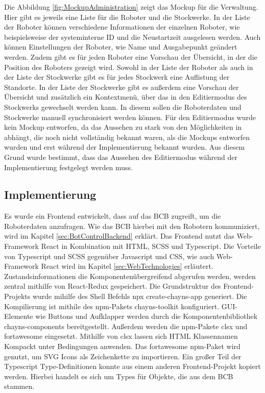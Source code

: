 Die Abbildung \ref{fig:MockupAdministration} zeigt das Mockup für die Verwaltung. Hier gibt es jeweils eine Liste für die Roboter und die Stockwerke. In der Liste der Roboter können verschiedene Informationen der einzelnen Roboter, wie beispielsweise der systeminterne \ac{ID} und die Neustartzeit ausgelesen werden. Auch können Einstellungen der Roboter, wie Name und Ausgabepunkt geändert werden. Zudem gibt es für jeden Roboter eine Vorschau der Übersicht, in der die Position des Roboters gezeigt wird. Sowohl in der Liste der Roboter als auch in der Liste der Stockwerke gibt es für jedes Stockwerk eine Auflistung der Standorte. In der Liste der Stockwerke gibt es außerdem eine Vorschau der Übersicht und zusätzlich ein Kontextmenü, über das in den Editiermodus des Stockwerks gewechselt werden kann. In diesem sollen die Roboterdaten und Stockwerke manuell synchronisiert werden können. Für den Editiermodus wurde kein Mockup entworfen, da das Aussehen zu stark von den Möglichkeiten in \deckgl{} abhängt, die noch nicht vollständig bekannt waren, als die Mockups entworfen wurden und erst während der Implementierung bekannt wurden. Aus diesem Grund wurde bestimmt, dass das Aussehen des Editiermodus während der Implementierung festgelegt werden muss.

\subsection{Implementierung}
Es wurde ein Frontend entwickelt, dass auf das \ac{BCB} zugreift, um die Roboterdaten anzufragen. Wie das \ac{BCB} hierbei mit den Robotern kommuniziert, wird im Kapitel \ref{sec:BotControlBackend} erklärt. Das Frontend nutzt das Web-Framework React in Kombination mit \ac{HTML}, \ac{SCSS} und Typescript. Die Vorteile von Typescript und \ac{SCSS} gegenüber Javascript und \ac{CSS}, wie auch Web-Framework React wird im Kapitel \ref{sec:WebTechnologies} erläutert.
Zustandsinformationen die Komponentenübergreifend abgerufen werden, werden zentral mithilfe von React-Redux gespeichert. Die Grundstruktur des Frontend-Projekts wurde mihilfe des Shell Befehls npx create-chayns-app \cite{CreateChaynsApp} generiert. Die Kompilierung ist mithile des \ac{npm}-Pakets chayns-toolkit \cite{ChaynsToolkit} konfiguriert. \ac{GUI}-Elemente wie Buttons und Aufklapper werden durch die Komponentenbibliothek chayns-components \cite{ChaynsComponents} bereitgestellt. Außerdem werden die \ac{npm}-Pakete clsx \cite{clsx} und fortawesome \cite{fontawesome} eingesetzt. Mithilfe von clsx lassen sich HTML Klassennamen Kompackt unter Bedingungen anwenden. Das fortawesome \ac{npm}-Paket wird genutzt, um \ac{SVG} Icons als Zeichenkette zu importieren. Ein großer Teil der Typescript Type-Definitionen konnte aus einem anderen Frontend-Projekt kopiert werden. Hierbei handelt es sich um Types für Objekte, die aus dem \ac{BCB} stammen.

